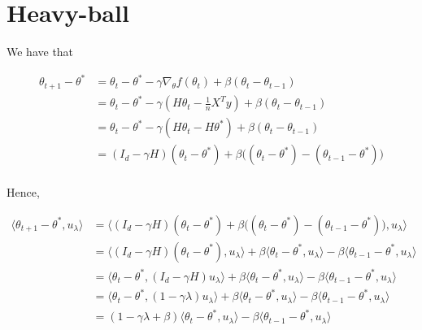 \documentclass[
10pt, %
a4paper, %
oneside, %
headinclude,footinclude, %
BCOR5mm, %
]{scrartcl}
\title{\normalfont{FTML practical session 16 solution}}
\author{\spacedlowsmallcaps{}
}
\date{\today}
\begin{document}
\renewcommand{\sectionmark}[1]{\markright{\spacedlowsmallcaps{#1}}}
\lehead{\mbox{\llap{\small\thepage\kern1em\color{halfgray} \vline}\color{halfgray}\hspace{0.5em}\rightmark\hfil}} 
\pagestyle{scrheadings}
\maketitle 
\setcounter{tocdepth}{3} 

\section{\large\color{Blue}Heavy-ball}

\exercice{}

We have that 

\begin{equation}
    \begin{aligned}
        \label{eq:}
	\theta_{t+1}- \theta^* &= \theta_{t}- \theta^*- \gamma \nabla_{ \theta}f(\theta_t)+ \beta( \theta_{t}- \theta_{t-1})  \\
	&= \theta_{t}- \theta^*- \gamma ( H \theta_{t}- \frac{1}{n} X^T y)+ \beta( \theta_{t}- \theta_{t-1})  \\
	&= \theta_{t}- \theta^*- \gamma ( H \theta_{t}- H \theta^*)+ \beta( \theta_{t}- \theta_{t-1})  \\
	&= (I_d- \gamma H)(\theta_{t}- \theta^*)+ \beta\Big( (\theta_{t}- \theta^*)- (\theta_{t-1}-\theta^*)\Big)  \\
    \end{aligned}
\end{equation}

Hence,

\begin{equation}
    \begin{aligned}
        \label{eq:}
	\langle \theta_{t+1}- \theta^*, u_{\lambda} \rangle &=     \langle (I_d- \gamma H)(\theta_{t}- \theta^*)+ \beta\Big( (\theta_{t}- \theta^*)- (\theta_{t-1}-\theta^*)\Big), u_{\lambda} \rangle\\
	&= \langle (I_d- \gamma H)(\theta_{t}- \theta^*), u_{\lambda} \rangle+ \beta\langle \theta_{t}- \theta^*, u_{\lambda} \rangle- \beta\langle\theta_{t-1}-\theta^*, u_{\lambda} \rangle\\
	&= \langle \theta_{t}- \theta^*, (I_d- \gamma H)u_{\lambda} \rangle+ \beta\langle \theta_{t}- \theta^*, u_{\lambda} \rangle- \beta\langle\theta_{t-1}-\theta^*, u_{\lambda} \rangle\\
	&= \langle \theta_{t}- \theta^*, (1- \gamma \lambda)u_{\lambda} \rangle+ \beta\langle \theta_{t}- \theta^*, u_{\lambda} \rangle- \beta\langle\theta_{t-1}-\theta^*, u_{\lambda} \rangle\\
	&= (1- \gamma \lambda+ \beta)\langle \theta_{t}- \theta^*, u_{\lambda} \rangle - \beta\langle\theta_{t-1}-\theta^*, u_{\lambda} \rangle\\
    \end{aligned}
\end{equation}
\end{document}
